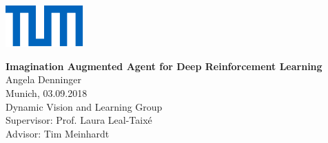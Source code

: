 \newcommand{\thema}{Imagination Augmented Agent for Deep Reinforcement Learning}
\newcommand{\schlagworte}{}

\newcommand{\zusammenfassung}{bla

\vspace*{0.3cm}

blub
}


\newcommand{\autor}{Angela Denninger}
\newcommand{\autorStrasse}{Hindenburgstr. 13}
\newcommand{\autorPLZ}{78467 }
\newcommand{\autorOrt}{Garching bei München}

\newcommand{\autorGeburtsort}{Tübingen}
\newcommand{\autorGeburtsdatum}{17.06.1990}

\newcommand{\supervisor}{Prof. Laura Leal-Taixé}
\newcommand{\advisor}{Tim Meinhardt}


\newpage

\begin{titlepage}

\vspace*{-1.5cm}
\begin{flushleft}
\hspace*{-1cm} \includegraphics[width=3.0cm]{Images/Universitaet_Logo_RGB}
\end{flushleft}

\vspace{2.5cm}

\begin{center}
	\huge{\textbf{\thema}} \\[1.5cm]

	\LARGE{\autor} \\[0.5cm]
	
	\large{Munich, 03.09.2018}\\[2.3cm]	
	
	\Large{Dynamic Vision and Learning Group}\\[1.5cm]
	
	\large{Supervisor: \supervisor}\\
	\large{Advisor: \advisor}
\end{center}

\vspace*{3.5cm}



\end{titlepage}

